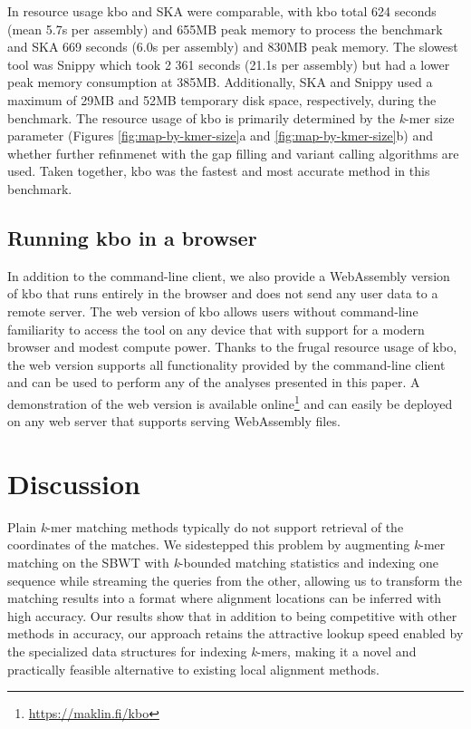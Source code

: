 \documentclass[unnumsec,webpdf,modern,large]{biorxiv}%
\theoremstyle{thmstyleone}%
\theoremstyle{thmstyletwo}%
\theoremstyle{thmstylethree}%
\newcommand{\kbo}{{\sf kbo}}
\begin{document}
In resource usage {\sf kbo} and SKA were comparable, with {\sf kbo} total 624 seconds (mean 5.7s per assembly) and 655MB peak memory to process the benchmark and SKA 669 seconds (6.0s per assembly) and 830MB peak memory. The slowest tool was Snippy which took 2 361 seconds (21.1s per assembly) but had a lower peak memory consumption at 385MB. Additionally, SKA and Snippy used a maximum of 29MB and 52MB temporary disk space, respectively, during the benchmark. The resource usage of {\sf kbo} is primarily determined by the \emph{k}-mer size parameter (Figures \ref{fig:map-by-kmer-size}a and \ref{fig:map-by-kmer-size}b) and whether further refinmenet with the gap filling and variant calling algorithms are used. Taken together, {\sf kbo} was the fastest and most accurate method in this benchmark.

\subsection{Running {\kbo} in a browser}
In addition to the command-line client, we also provide a WebAssembly version of {\sf kbo} that runs entirely in the browser and does not send any user data to a remote server. The web version of {\sf kbo} allows users without command-line familiarity to access the tool on any device that with support for a modern browser and modest compute power. Thanks to the frugal resource usage of {\sf kbo}, the web version supports all functionality provided by the command-line client and can be used to perform any of the analyses presented in this paper. A demonstration of the web version is available online\footnote{\url{https://maklin.fi/kbo}} and can easily be deployed on any web server that supports serving WebAssembly files.

\section{Discussion}

Plain \emph{k}-mer matching methods typically do not support retrieval of the coordinates of the matches. We sidestepped this problem by augmenting \emph{k}-mer matching on the SBWT \cite{alanko2023small} with \emph{k}-bounded matching statistics \cite{alanko2023longest,alanko2024finimizers} and indexing one sequence while streaming the queries from the other, allowing us to transform the matching results into a format where alignment locations can be inferred with high accuracy. Our results show that in addition to being competitive with other methods in accuracy, our approach retains the attractive lookup speed enabled by the specialized data structures for indexing \emph{k}-mers, making it a novel and practically feasible alternative to existing local alignment methods.
\end{document}
